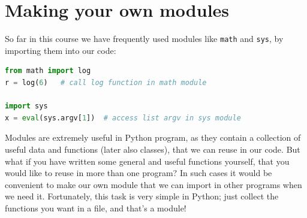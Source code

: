 \documentclass[graybox,envcountchap,sectrefs,final]{svmonodo}
\begin{document}
\section{Making your own modules}
So far in this course we have frequently used modules like \texttt{math} and \texttt{sys}, by importing them
into our code:
\begin{lstlisting}[language=Python,style=blue1]
from math import log
r = log(6)   # call log function in math module

import sys
x = eval(sys.argv[1])  # access list argv in sys module
\end{lstlisting}
Modules are extremely useful in Python program, as they contain a collection of useful data and functions
(later also classes), that we can reuse in our code. But what if you have written some general and useful functions
yourself, that you would like to reuse in more than one program? In such cases it would be convenient to make our own
module that we can import in other programs when we need it. Fortunately, this task is very simple in Python; just
collect the functions you want in a file, and that's a module!
\end{document}
